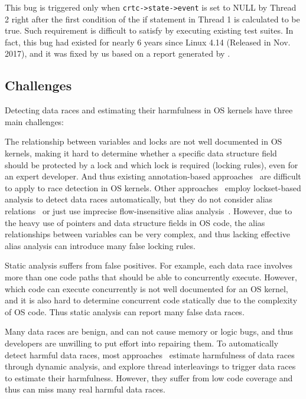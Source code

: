 This bug is triggered only when {\tt crtc->state->event} is set to NULL by 
Thread 2 right after the first condition of the if statement in Thread 1 is 
calculated to be true. Such requirement is difficult to satisfy by executing 
existing test suites. In fact, this bug had existed for nearly 6 years since 
Linux 4.14 (Released in Nov. 2017), and it was fixed by us based on a report 
generated by \sys. 
 
\subsection{Challenges}
\label{subsec_challenges}
Detecting data races and estimating their harmfulness in OS kernels have three 
main challenges:

 The relationship between variables and locks 
are not well documented in OS kernels, making it hard to determine whether a 
specific data structure field should be protected by a lock and which lock is 
required (locking rules), even for an expert developer. And thus existing 
annotation-based approaches~\cite{Boyapati:OOPSLA02, Anderson:PLDI08, 
Anderson:PLDI09, Zhou:MICRO19, Flanagan:PASTE01, Flanagan:PLDI00, 
Sadowski:PLATEAU14, ClangThreadSafety, Blackshear:OOPSLA18} are difficult to 
apply to race detection in OS kernels. Other approaches~\cite{Choi:PLDI02, 
Engler:SOSP03, Voung:FSE07, Pratikakis:PLDI06, Naik:PLDI06} employ 
lockset-based analysis to detect data races automatically, but they do not 
consider alias relations~\cite{Voung:FSE07, Engler:SOSP03} or just use 
imprecise flow-insensitive alias analysis~\cite{Choi:PLDI02, 	
Pratikakis:PLDI06, Naik:PLDI06}. However, due to the heavy use of pointers and 
data structure fields in OS code, the alias relationships between variables can 
be very complex, and thus lacking effective alias analysis can introduce many 
false locking rules.

 Static analysis suffers from false 
positives. For example, each data race involves more than one code paths that 
should be able to concurrently execute. However, which code can execute 
concurrently is not well documented for an OS kernel, and it is also hard to 
determine concurrent code statically due to the complexity of OS code. Thus 
static analysis can report many false data races.

 Many data races are benign, and 
can not cause memory or logic bugs, and thus developers are unwilling to put 
effort into repairing them. To automatically detect harmful data races, most 
approaches~\cite{Narayanasamy:PLDI07, Sen:PLDI08, Kasikci:SOSP13, 
Kasikci:ASPLOS12} estimate harmfulness of data races through dynamic analysis, 
and explore thread interleavings to trigger data races to estimate their 
harmfulness. However, they suffer from low code coverage and thus can miss many 
real harmful data races.


